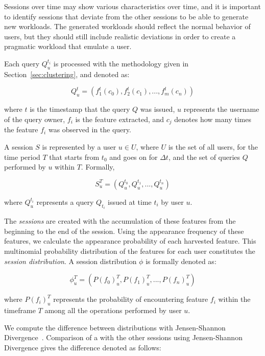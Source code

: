 Sessions over time may show various characteristics over time, and it is important to identify sessions that deviate from the other sessions to be able to generate new workloads.
The generated workloads should reflect the normal behavior of users, but they should still include realistic deviations in order to create a pragmatic workload that emulate a user.

Each query $Q^{t_i}_u$ is processed with the methodology given in Section~\ref{sec:clustering}, and denoted as:

\begin{equation}
Q^{t}_u = ( f^{t}_1(c_0), f_2^{t}(c_1), ... , f_m^{t}(c_n) )
\end{equation}

where $t$ is the timestamp that the query $Q$ was issued, $u$ represents the username of the query owner, $f_i$ is the feature extracted, and $c_j$ denotes how many times the feature $f_i$ was observed in the query.

A session $S$ is represented by a user $u \in U$, where $U$ is the set of all users, for the time period $T$ that starts from $t_0$ and goes on for $\Delta t$, and the set of queries $Q$ performed by $u$ within $T$. Formally,

\begin{equation}
S^T_u = ( Q^{t_0}_u, Q^{t_1}_u, ... , Q^{t_n}_u )
\end{equation}

where $Q^{t_i}_u$ represents a query $Q_{t_i}$ issued at time $t_i$ by user $u$.

The \textit{sessions} are created with the accumulation of these features from the beginning to the end of the session.
Using the appearance frequency of these features, we calculate the appearance probability of each harvested feature.
This multinomial probability distribution of the features for each user constitutes the \textit{session distribution}.
A session distribution $\phi$ is formally denoted as:

\begin{equation}
\phi^T_u = ( P(f_0)^{T}_u, P(f_1)^{T}_u, ... , P(f_n)^{T}_u )
\end{equation}

where $P(f_i)^{T}_u$ represents the probability of encountering feature $f_i$ within the timeframe $T$ among all the operations performed by user $u$.


We compute the difference between distributions with Jensen-Shannon Divergence~\cite{fuglede2004jensen}. Comparison of a with the other sessions using Jensen-Shannon Divergence gives the difference denoted as follows:

